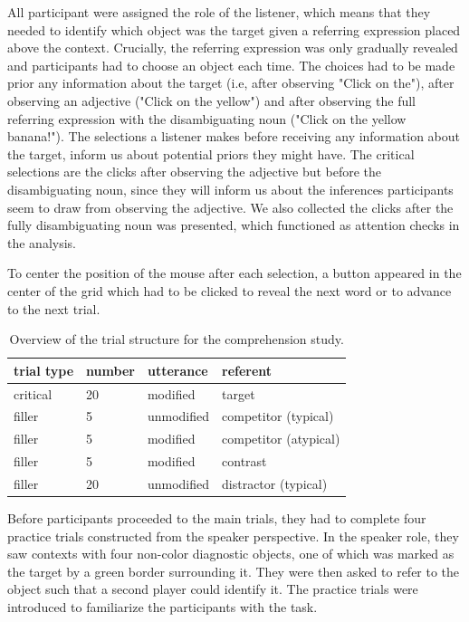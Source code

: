 \documentclass[10pt,letterpaper]{article}
\begin{document}
All participant were assigned the role of the listener, which means that they needed to identify which object was the target given a referring expression placed above the context. Crucially, the referring expression was only gradually revealed and participants had to choose an object each time. The choices had to be made prior any information about the target (i.e, after observing "Click on the"), after observing an adjective ("Click on the yellow") and after observing the full referring expression with the disambiguating noun ("Click on the yellow banana!"). The selections a listener makes before receiving any information about the target, inform us about potential priors they might have. The critical selections are the clicks after observing the adjective but before the disambiguating noun, since they will inform us about the inferences participants seem to draw from observing the adjective. We also collected the clicks after the fully disambiguating noun was presented, which functioned as attention checks in the analysis. 

To center the position of the mouse after each selection, a button appeared in the center of the grid which had to be clicked to reveal the next word or to advance to the next trial. 

\begin{table}
	\begin{center} 
	\caption{Overview of the trial structure for the comprehension study.} 
	\label{tab:trialstructure}
	\vskip 0.12in
	\begin{tabular}{llll} 
	\hline
	\textbf{trial type} & \textbf{number} & \textbf{utterance} & \textbf{referent} \\
	\hline
	critical  & 20     & modified       & target                \\
	filler    & 5      & unmodified     & competitor (typical)  \\
	filler    & 5      & modified       & competitor (atypical) \\
	filler    & 5      & modified       & contrast              \\
	filler    & 20     & unmodified     & distractor (typical)  \\
	\hline
	\end{tabular} 
	\end{center} 
	\end{table}

Before participants proceeded to the main trials, they had to complete four practice trials constructed from the speaker perspective. In the speaker role, they saw contexts with four non-color diagnostic objects, one of which was marked as the target by a green border surrounding it. They were then asked to refer to the object such that a second player could identify it. The practice trials were introduced to familiarize the participants with the task.
\end{document}
